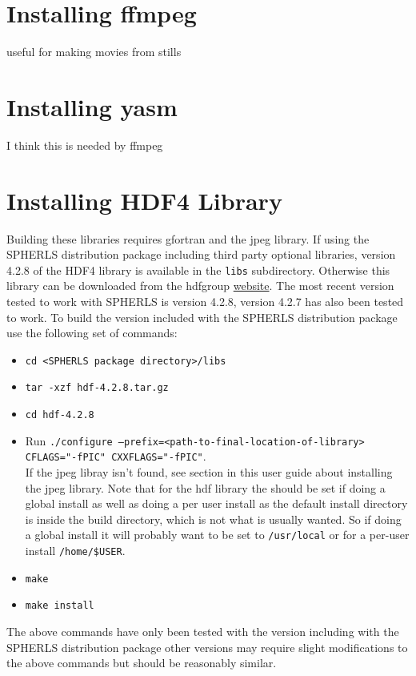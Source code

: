 \documentclass[12pt,a4paper]{book}
\begin{document}
\section{Installing ffmpeg}
useful for making movies from stills

\section{Installing yasm}
I think this is needed by ffmpeg

\section{Installing HDF4 Library}
Building these libraries requires gfortran and the jpeg library. If using the SPHERLS distribution package including third party optional libraries, version 4.2.8 of the HDF4 library is available in the {\tt libs} subdirectory. Otherwise this library can be downloaded from the hdfgroup \href{http://www.hdfgroup.org/ftp/HDF/HDF_Current/src/}{website}. The most recent version tested to work with SPHERLS is version 4.2.8, version 4.2.7 has also been tested to work. To build the version included with the SPHERLS distribution package use the following set of commands:
\begin{itemize}
\item {\tt cd <SPHERLS package directory>/libs}
\item {\tt tar -xzf hdf-4.2.8.tar.gz}
\item {\tt cd hdf-4.2.8}
\item Run {\tt ./configure --prefix=<path-to-final-location-of-library> CFLAGS="-fPIC" CXXFLAGS="-fPIC"}.\\ If the jpeg libray isn't found, see section in this user guide about installing the jpeg library. Note that for the hdf library the {\tt <path-to-final-location-of-library>} should be set if doing a global install as well as doing a per user install as the default install directory is inside the build directory, which is not what is usually wanted. So if doing a global install it will probably want to be set to {\tt /usr/local} or for a per-user install {\tt /home/\$USER}.
\item {\tt make}
\item {\tt make install}
\end{itemize}
The above commands have only been tested with the version including with the SPHERLS distribution package other versions may require slight modifications to the above commands but should be reasonably similar.
\end{document}
